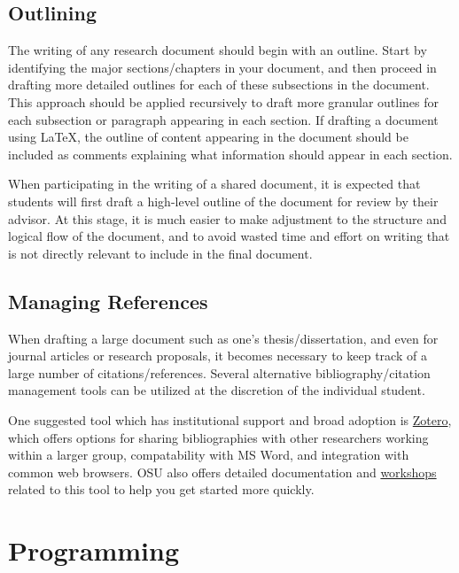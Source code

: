 \documentclass[12pt,a4paper,article,oneside]{memoir} %
\begin{document}
\subsection{Outlining}

The writing of any research document should begin with an outline. Start by identifying the major sections/chapters in your document, and then proceed in drafting more detailed outlines for each of these subsections in the document. This approach should be applied recursively to draft more granular outlines for each subsection or paragraph appearing in each section. If drafting a document using \LaTeX{}, the outline of content appearing in the document should be included as comments explaining what information should appear in each section.

When participating in the writing of a shared document, it is expected that students will first draft a high-level outline of the document for review by their advisor. At this stage, it is much easier to make adjustment to the structure and logical flow of the document, and to avoid wasted time and effort on writing that is not directly relevant to include in the final document.

\subsection{Managing References}

When drafting a large document such as one's thesis/dissertation, and even for journal articles or research proposals, it becomes necessary to keep track of a large number of citations/references. Several alternative bibliography/citation management tools can be utilized at the discretion of the individual student.

One suggested tool which has institutional support and broad adoption is \href{https://info.library.okstate.edu/zotero}{Zotero}, which offers options for sharing bibliographies with other researchers working within a larger group, compatability with MS Word, and integration with common web browsers. OSU also offers detailed documentation and \href{https://info.library.okstate.edu/zotero}{workshops} related to this tool to help you get started more quickly.


\section{Programming}
\end{document}
